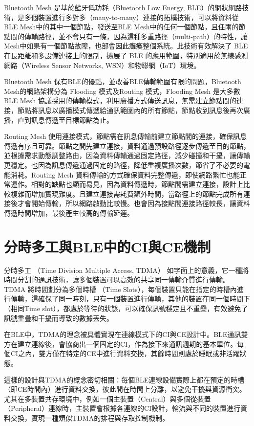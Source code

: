 \begin{ZhChapter}
Bluetooth Mesh 是基於藍牙低功耗（Bluetooth Low Energy, BLE）的網狀網路技術，是多個裝置進行多對多（many-to-many）連接的拓樸技術，可以將資料從BLE Mesh中的其中一個節點，發送至BLE Mesh中的任何一個節點，且任兩的節點間的傳輸路徑，並不會只有一條，因為這種多重路徑（multi-path）的特性，讓Mesh中如果有一個節點故障，也部會因此癱瘓整個系統。此技術有效解決了 BLE 在長距離和多設備連接上的限制，擴展了 BLE 的應用範圍，特別適用於無線感測網路（Wireless Sensor Networks, WSN）和物聯網（IoT）環境。

Bluetooth Mesh 保有BLE的優點，並改善BLE傳輸範圍有限的問題，Bluetooth Mesh的網路架構分為 Flooding 模式及Routing 模式，Flooding Mesh 是大多數 BLE Mesh 協議採用的傳輸模式，利用廣播方式傳送訊息，無需建立節點間的連接，節點將訊息以廣播模式傳遞給通訊範圍內的所有節點，節點收到訊息後再次廣播，直到訊息傳遞至目標節點為止。

Routing Mesh 使用連接模式，節點需在訊息傳輸前建立節點間的連接，確保訊息傳遞有序且可靠。節點之間先建立連接，資料通過預設路徑逐步傳遞至目的節點，並根據需求動態調整路由，因為資料傳輸通過固定路徑，減少碰撞和干擾，讓傳輸更穩定。也因為訊息傳遞通過固定的路徑，降低重複廣播次數，節省了不必要的電能消耗。Routing Mesh 資料傳輸的方式確保資料完整傳遞，即使網路繁忙也能正常運作。相對的缺點也顯而易見，因為資料傳遞時，節點間需建立連接，設計上比較複雜而增加實現難度。且建立連接需耗費額外時間，當路徑上的節點完成所有連接後才會開始傳輸，所以網路啟動比較慢。也會因為接點間連接路徑較長，讓資料傳遞時間增加，最後產生較高的傳輸延遲。

\section{分時多工與BLE中的CI與CE機制}

分時多工 （Time Division Multiple Access, TDMA） 如字面上的意義，它一種將時間分割的通訊技術，讓多個裝置可以高效的共享同一傳輸介質進行傳輸。TDMA 將時間劃分為多個時槽 （Time Slots），每個裝置只能在指定的時槽內進行傳輸，這確保了同一時刻，只有一個裝置進行傳輸，其他的裝置在同一個時間下（相同Time slot），都處於等待的狀態，可以確保訊號穩定且不重疊，有效避免了訊號重疊和干擾而導致的數據丟失。

在BLE中，TDMA的理念被具體實現在連線模式下的CI與CE設計中。BLE通訊雙方在建立連線後，會協商出一個固定的CI，作為接下來通訊週期的基本單位。每個CI之內，雙方僅在特定的CE中進行資料交換，其餘時間則處於睡眠或非活躍狀態。

這樣的設計與TDMA的概念密切相關：每個BLE連線設備實際上都在預定的時槽（即CE時間內）進行資料交換，彼此間在時間上分離，以避免干擾與資源衝突。尤其在多裝置共存環境中，例如一個主裝置（Central）與多個從裝置（Peripheral）連線時，主裝置會根據各連線的CI設計，輪流與不同的裝置進行資料交換，實現一種類似TDMA的排程與存取控制機制。


\end{ZhChapter}
